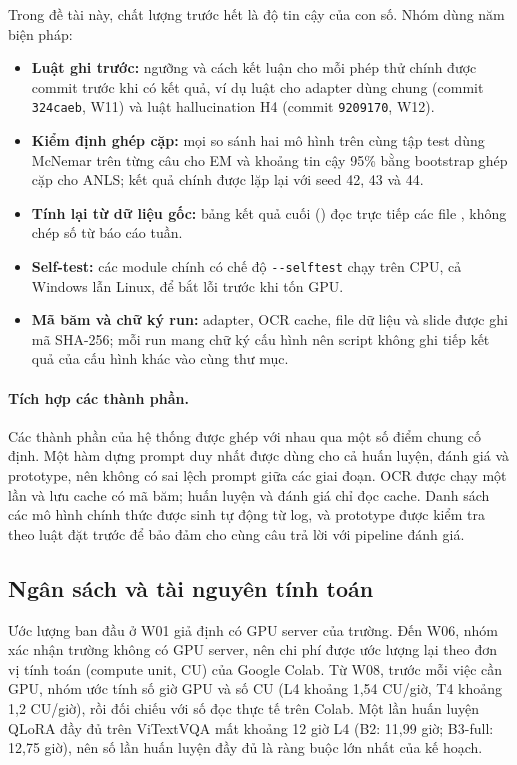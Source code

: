 Trong đề tài này, chất lượng trước hết là độ tin cậy của con số. Nhóm dùng năm
biện pháp:

\begin{itemize}
  \item \textbf{Luật ghi trước:} ngưỡng và cách kết luận cho mỗi phép thử chính
  được commit trước khi có kết quả, ví dụ luật cho adapter dùng chung (commit
  \texttt{324caeb}, W11) và luật hallucination H4 (commit \texttt{9209170}, W12).
  \item \textbf{Kiểm định ghép cặp:} mọi so sánh hai mô hình trên cùng tập test
  dùng McNemar trên từng câu cho EM và khoảng tin cậy 95\% bằng bootstrap ghép
  cặp cho ANLS; kết quả chính được lặp lại với seed 42, 43 và 44.
  \item \textbf{Tính lại từ dữ liệu gốc:} bảng kết quả cuối
  () đọc trực tiếp các file
  , không chép số từ báo cáo tuần.
  \item \textbf{Self-test:} các module chính có chế độ \texttt{-{}-selftest} chạy
  trên CPU, cả Windows lẫn Linux, để bắt lỗi trước khi tốn GPU.
  \item \textbf{Mã băm và chữ ký run:} adapter, OCR cache, file dữ liệu và slide
  được ghi mã SHA-256; mỗi run mang chữ ký cấu hình nên script không ghi tiếp kết
  quả của cấu hình khác vào cùng thư mục.
\end{itemize}

\paragraph{Tích hợp các thành phần.} Các thành phần của hệ thống được ghép với nhau qua một số điểm chung cố định. Một
hàm dựng prompt duy nhất được dùng cho cả huấn luyện, đánh giá và prototype, nên
không có sai lệch prompt giữa các giai đoạn. OCR được chạy một lần và lưu cache
có mã băm; huấn luyện và đánh giá chỉ đọc cache. Danh sách các mô hình chính thức
được sinh tự động từ log, và prototype được kiểm tra theo luật đặt trước để bảo
đảm cho cùng câu trả lời với pipeline đánh giá.

\subsection{Ngân sách và tài nguyên tính toán}
\label{sec:pm-budget}

Ước lượng ban đầu ở W01 giả định có GPU server của trường. Đến W06, nhóm xác
nhận trường không có GPU server, nên chi phí được ước lượng lại theo đơn vị tính
toán (compute unit, CU) của Google Colab. Từ W08, trước mỗi việc cần GPU, nhóm
ước tính số giờ GPU và số CU (L4 khoảng 1,54 CU/giờ, T4 khoảng 1,2 CU/giờ), rồi
đối chiếu với số đọc thực tế trên Colab. Một lần huấn luyện QLoRA đầy đủ trên
ViTextVQA mất khoảng 12 giờ L4 (B2: 11,99 giờ; B3-full: 12,75 giờ), nên số lần
huấn luyện đầy đủ là ràng buộc lớn nhất của kế hoạch.

